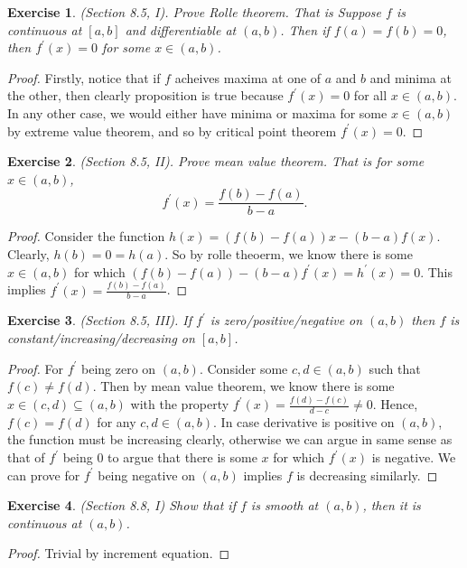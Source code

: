 \documentclass[a4paper, 11pt, openany]{book}
\theoremstyle{plain}
\newtheorem{exercise}{Exercise}[chapter]
\theoremstyle{plain}
\newcommand{\p}{\prime}
\begin{document}
    \begin{exercise}
      (Section 8.5, I).
      Prove Rolle theorem. That is Suppose $f$ is continuous at $[a,b]$ and differentiable at $(a,b)$. Then if $f(a)=f(b)=0$, then $f^\p(x)=0$ for some $x \in (a,b)$.
    \end{exercise}
    \begin{proof}
      Firstly, notice that if $f$ acheives maxima at one of $a$ and $b$ and minima at the other, then clearly proposition is true because $f^\p (x)=0$ for all $x \in (a,b)$. In any other case, we would either have minima or maxima for some $ x \in (a,b)$ by extreme value theorem, and so by critical point theorem $f^\p (x)=0$.
    \end{proof}

    \begin{exercise}
      (Section 8.5, II). Prove mean value theorem. That is for some $x \in (a,b)$, $$f^\p (x)=\frac{f(b)-f(a)}{b-a}.$$
    \end{exercise}
    \begin{proof}
      Consider the function $h(x)=(f(b)-f(a))x-(b-a)f(x)$. Clearly, $h(b)=0=h(a)$. So by rolle theoerm, we know there is some $x\in (a,b)$ for which $(f(b)-f(a))-(b-a)f^\p(x)=h^\p(x)=0$. This implies $f^\p(x)=\frac{f(b)-f(a)}{b-a}$.
    \end{proof}

    \begin{exercise}
      (Section 8.5, III).
      If $f^\p$ is zero/positive/negative on $(a,b)$ then $f$ is constant/increasing/decreasing on $[a,b]$.
    \end{exercise}
    \begin{proof}
      For $f^\p$ being zero on $(a,b)$. Consider some $c,d \in (a,b)$ such that $f(c) \not =f(d)$. Then by mean value theorem, we know there is some $x \in (c,d) \subseteq (a,b)$ with the property $f^\p(x) = \frac{f(d)-f(c)}{d-c} \not =0$. Hence, $f(c)=f(d)$ for any $c,d \in (a,b)$. In case derivative is positive on $(a,b)$, the function must be increasing clearly, otherwise we can argue in same sense as that of $f^\p$ being $0$ to argue that there is some $x$ for which $f^\p(x)$ is negative. We can prove for $f^\p$ being negative on $(a,b)$ implies $f$ is decreasing similarly.
    \end{proof}

    \begin{exercise}
      (Section 8.8, I)
      Show that if $f$ is smooth at $(a,b)$, then it is continuous at $(a,b)$.
    \end{exercise}
    \begin{proof}
      Trivial by increment equation.
    \end{proof}
\end{document}
